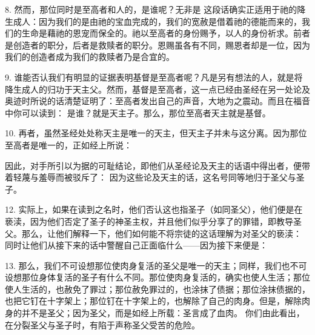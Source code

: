 8. 然而，那位同时是至高者和人的，是谁呢？无非是 这段话确实正适用于祂的降生成人：因为我们的是由祂的宝血完成的，我们的宽赦是借着祂的德能而来的，我们的生命是藉祂的恩宠而保全的。祂以至高者的身份赐予，以人的身份祈求。前者是创造者的职分，后者是救赎者的职分。恩赐虽各有不同，赐恩者却是一位，因为我们的创造者成为我们的救赎者乃是合宜的。\par

9. 谁能否认我们有明显的证据表明基督是至高者呢？凡是另有想法的人，就是将降生成人的归功于天主父。然而，基督是至高者，这一点已经由圣经在另一处论及奥迹时所说的话清楚证明了：至高者发出自己的声音，大地为之震动。而且在福音中你可以读到： 是谁？就是天主子。那么，那位至高者天主就是基督。\par

10. 再者，虽然圣经处处称天主是唯一的天主，但天主子并未与这分离。因为那位至高者是唯一的，正如经上所说：\par

因此，对手所引以为据的可耻结论，即他们从圣经论及天主的话语中得出者，便带着轻蔑与羞辱而被驳斥了： 因为这些论及天主的话，这名号同等地归于圣父与圣子。\par

12. 实际上，如果在读到之名时，他们否认这也指圣子（如同圣父），他们便是在亵渎，因为他们否定了圣子的神圣主权，并且他们似乎分享了的罪错，即教导圣父。那么，让他们解释一下，他们如何能不将宗徒的这话理解为对圣父的亵渎： 同时让他们从接下来的话中警醒自己正面临什么——因为接下来便是：\par

13. 那么，我们不可设想那位使肉身复活的圣父是唯一的天主；同样，我们也不可设想那位身体复活的圣子有什么不同。那位使肉身复活的，确实也使人生活；那位使人生活的，也赦免了罪过；那位赦免罪过的，也涂抹了债据；那位涂抹债据的，也把它钉在十字架上；那位钉在十字架上的，也解除了自己的肉身。但是，解除肉身的并不是圣父；因为圣父，而是如经上所载：圣言成了血肉。 你们由此看出，在分裂圣父与圣子时，有陷于声称圣父受苦的危险。\par

